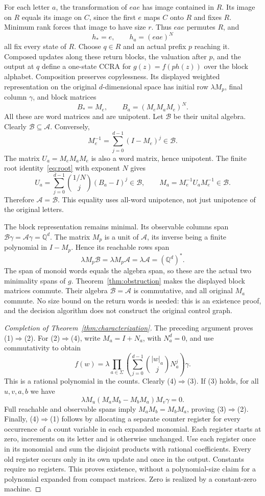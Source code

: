 \documentclass[acmlarge,screen,11pt,nonacm]{acmart}
\newcommand{\Q}{\mathbb{Q}}
\theoremstyle{definition}
\begin{document}
For each letter $a$, the transformation of $eae$ has image contained in $R$. Its image on $R$ equals its image on $C$, since the first $e$ maps $C$ onto $R$ and fixes $R$. Minimum rank forces that image to have size $r$. Thus $eae$ permutes $R$, and
\[
 h_* =e,\qquad h_a=(eae)^N
\]
all fix every state of $R$. Choose $q\in R$ and an actual prefix $p$ reaching it. Composed updates along these return blocks, the valuation after $p$, and the output at $q$ define a one-state CCRA for $g(z)=f(p h(z))$ over the block alphabet. Composition preserves copylessness. Its displayed weighted representation on the original $d$-dimensional space has initial row $\lambda M_p$, final column $\gamma$, and block matrices
\[
 B_*=M_e,\qquad B_a=(M_eM_aM_e)^N.
\]
All these are word matrices and are unipotent. Let $\mathcal B$ be their unital algebra. Clearly $\mathcal B\subseteq\mathcal A$. Conversely,
\[
 M_e^{-1}=\sum_{j=0}^{d-1}(I-M_e)^j\in\mathcal B.
\]
The matrix $U_a=M_eM_aM_e$ is also a word matrix, hence unipotent. The finite root identity~\eqref{eq:root} with exponent $N$ gives
\[
 U_a=\sum_{j=0}^{d-1}\binom{1/N}{j}(B_a-I)^j\in\mathcal B,
 \qquad M_a=M_e^{-1}U_aM_e^{-1}\in\mathcal B.
\]
Therefore $\mathcal A=\mathcal B$. This equality uses all-word unipotence, not just unipotence of the original letters.

The block representation remains minimal. Its observable columns span $\mathcal B\gamma=\mathcal A\gamma=\Q^d$. The matrix $M_p$ is a unit of $\mathcal A$, its inverse being a finite polynomial in $I-M_p$. Hence its reachable rows span
\[
 \lambda M_p\mathcal B=\lambda M_p\mathcal A
   =\lambda\mathcal A=(\Q^d)^*.
\]
The span of monoid words equals the algebra span, so these are the actual two minimality spans of $g$. Theorem~\ref{thm:obstruction} makes the displayed block matrices commute. Their algebra $\mathcal B=\mathcal A$ is commutative, and all original $M_a$ commute. No size bound on the return words is needed: this is an existence proof, and the decision algorithm does not construct the original control graph.

\begin{proof}[Completion of Theorem~\ref{thm:characterization}]
The preceding argument proves (1)$\Rightarrow$(2). For (2)$\Rightarrow$(4), write $M_a=I+N_a$, with $N_a^d=0$, and use commutativity to obtain
\[
 f(w)=\lambda\prod_{a\in\Sigma}
 \left(\sum_{j=0}^{d-1}\binom{|w|_a}{j}N_a^j\right)\gamma.
\]
This is a rational polynomial in the counts. Clearly (4)$\Rightarrow$(3). If (3) holds, for all $u,v,a,b$ we have
\[
 \lambda M_u(M_aM_b-M_bM_a)M_v\gamma=0.
\]
Full reachable and observable spans imply $M_aM_b=M_bM_a$, proving (3)$\Rightarrow$(2). Finally, (4)$\Rightarrow$(1) follows by allocating a separate counter register for every occurrence of a count variable in each expanded monomial. Each register starts at zero, increments on its letter and is otherwise unchanged. Use each register once in its monomial and sum the disjoint products with rational coefficients. Every old register occurs only in its own update and once in the output. Constants require no registers. This proves existence, without a polynomial-size claim for a polynomial expanded from compact matrices. Zero is realized by a constant-zero machine.
\end{proof}
\end{document}
